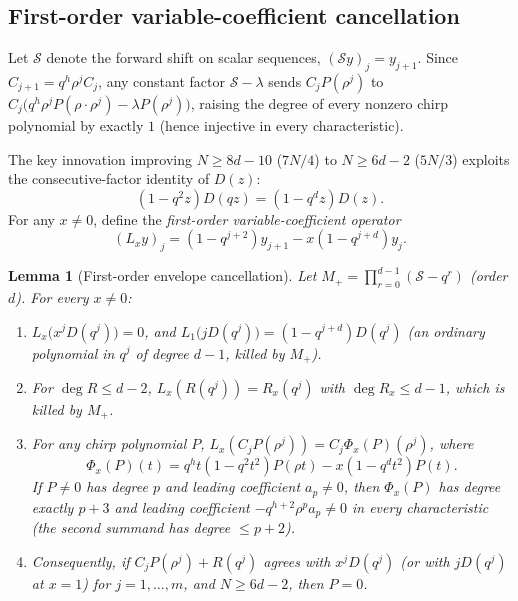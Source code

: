 \documentclass[11pt,reqno]{amsart}
\numberwithin{equation}{section}
\newtheorem{lemma}[theorem]{Lemma}
\theoremstyle{definition}
\theoremstyle{remark}
\begin{document}
\subsection{First-order variable-coefficient cancellation}

Let $\mathcal{S}$ denote the forward shift on scalar sequences, $(\mathcal{S}y)_j = y_{j+1}$. Since $C_{j+1}=q^h\rho^j C_j$, any constant factor $\mathcal{S}-\lambda$ sends $C_j P(\rho^j)$ to $C_j\bigl(q^h\rho^j P(\rho\cdot\rho^j)-\lambda P(\rho^j)\bigr)$, raising the degree of every nonzero chirp polynomial by exactly $1$ (hence injective in every characteristic).

The key innovation improving $N\ge 8d-10$ ($7N/4$) to $N\ge 6d-2$ ($5N/3$) exploits the consecutive-factor identity of $D(z)$:
\begin{equation}
\label{eq:D-ratio}
(1 - q^2 z)D(qz) = (1 - q^d z)D(z).
\end{equation}
For any $x\ne 0$, define the \emph{first-order variable-coefficient operator}
\begin{equation}
\label{eq:Lx-def}
(L_x y)_j = (1 - q^{j+2})y_{j+1} - x(1 - q^{j+d})y_j.
\end{equation}

\begin{lemma}[First-order envelope cancellation]
\label{lem:first-order}
Let $M_+ = \prod_{r=0}^{d-1}(\mathcal{S}-q^r)$ (order $d$). For every $x\ne 0$:
\begin{enumerate}[label=(\roman*),leftmargin=2em]
\item $L_x\bigl(x^j D(q^j)\bigr) = 0$, and $L_1\bigl(jD(q^j)\bigr) = (1-q^{j+d})D(q^j)$ (an ordinary polynomial in $q^j$ of degree $d-1$, killed by $M_+$).
\item For $\deg R\le d-2$, $L_x(R(q^j)) = R_x(q^j)$ with $\deg R_x\le d-1$, which is killed by $M_+$.
\item For any chirp polynomial $P$, $L_x(C_j P(\rho^j)) = C_j \Phi_x(P)(\rho^j)$, where
\[
\Phi_x(P)(t) = q^h t(1-q^2 t^2)P(\rho t) - x(1-q^d t^2)P(t).
\]
If $P\ne 0$ has degree $p$ and leading coefficient $a_p\ne 0$, then $\Phi_x(P)$ has degree \emph{exactly} $p+3$ and leading coefficient $-q^{h+2}\rho^p a_p\ne 0$ in every characteristic (the second summand has degree $\le p+2$).
\item Consequently, if $C_j P(\rho^j)+R(q^j)$ agrees with $x^j D(q^j)$ (or with $jD(q^j)$ at $x=1$) for $j=1,\ldots,m$, and $N\ge 6d-2$, then $P=0$.
\end{enumerate}
\end{lemma}
\end{document}
